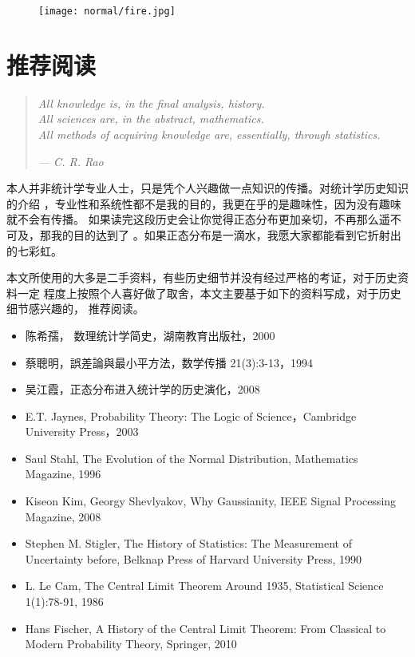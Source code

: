 \begin{figure}[htb]
\centering
\texttt{[image: normal/fire.jpg]}
\end{figure}

\newpage
\section{推荐阅读}

\begin{verse}
\emph{All knowledge is, in the final analysis, history.  \\
All sciences are, in the abstract, mathematics.  \\
All methods of acquiring knowledge are, essentially, through \mbox{statistics.} \\}


\emph{--- C. R. Rao}
\end{verse}

本人并非统计学专业人士，只是凭个人兴趣做一点知识的传播。对统计学历史知识的介绍
，专业性和系统性都不是我的目的，我更在乎的是趣味性，因为没有趣味就不会有传播。
如果读完这段历史会让你觉得正态分布更加亲切，不再那么遥不可及，那我的目的达到了
。如果正态分布是一滴水，我愿大家都能看到它折射出的七彩虹。

本文所使用的大多是二手资料，有些历史细节并没有经过严格的考证，对于历史资料一定
程度上按照个人喜好做了取舍，本文主要基于如下的资料写成，对于历史细节感兴趣的，
推荐阅读。

\begin{itemize}
\item 陈希孺， 数理统计学简史，湖南教育出版社，2000
\item 蔡聰明，誤差論與最小平方法，数学传播 21(3):3-13，1994
\item 吴江霞，正态分布进入统计学的历史演化，2008
\item E.T. Jaynes, Probability Theory: The Logic of Science，Cambridge University Press，2003
\item Saul Stahl, The Evolution of the Normal Distribution, Mathematics Magazine, 1996
\item Kiseon Kim, Georgy Shevlyakov, Why Gaussianity, IEEE Signal Processing Magazine, 2008
\item Stephen M. Stigler, The History of Statistics: The Measurement of Uncertainty before, Belknap Press of Harvard University Press, 1990
\item L. Le Cam, The Central Limit Theorem Around 1935, Statistical Science 1(1):78-91, 1986
\item Hans Fischer, A History of the Central Limit Theorem: From Classical to Modern Probability Theory, Springer, 2010
\end{itemize}
